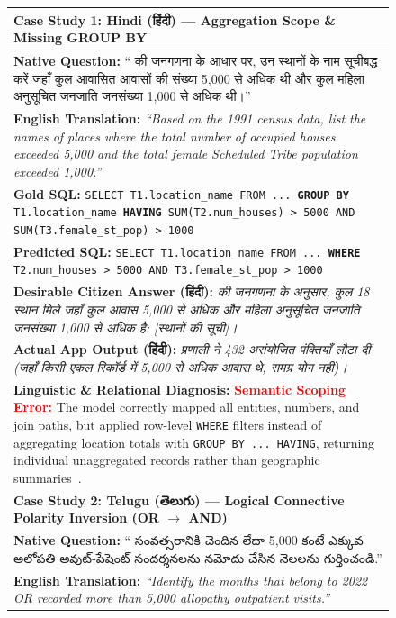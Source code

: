 \documentclass[conference]{IEEEtran}
\newcommand{\texthindi}[1]{{\hindifont #1}}
\newcommand{\texttelugu}[1]{{\telugufont #1}}
\newcommand{\texthindi}[1]{#1}
\newcommand{\texttelugu}[1]{#1}
\begin{document}
\begin{figure}[t]
\centering
\small
\renewcommand{\arraystretch}{1.2}
\begin{tabular}{|p{}|}
\hline
\textbf{\large Case Study 1: Hindi (\texthindi{हिंदी}) --- Aggregation Scope \& Missing GROUP BY} \\
\hline
\textbf{Native Question:} ``\texthindi{1991 की जनगणना के आधार पर, उन स्थानों के नाम सूचीबद्ध करें जहाँ कुल आवासित आवासों की संख्या 5,000 से अधिक थी और कुल महिला अनुसूचित जनजाति जनसंख्या 1,000 से अधिक थी।}'' \\
\textbf{English Translation:} \emph{``Based on the 1991 census data, list the names of places where the total number of occupied houses exceeded 5,000 and the total female Scheduled Tribe population exceeded 1,000.''} \\[3pt]
\textbf{Gold SQL:} \texttt{SELECT T1.location\_name FROM ... \textbf{GROUP BY} T1.location\_name \textbf{HAVING} SUM(T2.num\_houses) > 5000 AND SUM(T3.female\_st\_pop) > 1000} \\
\textbf{Predicted SQL:} \texttt{SELECT T1.location\_name FROM ... \textbf{WHERE} T2.num\_houses > 5000 AND T3.female\_st\_pop > 1000} \\[3pt]
\textbf{Desirable Citizen Answer (\texthindi{हिंदी}):} \emph{\texthindi{1991 की जनगणना के अनुसार, कुल 18 स्थान मिले जहाँ कुल आवास 5,000 से अधिक और महिला अनुसूचित जनजाति जनसंख्या 1,000 से अधिक है: [स्थानों की सूची]।}} \\
\textbf{Actual App Output (\texthindi{हिंदी}):} \emph{\texthindi{प्रणाली ने 432 असंयोजित पंक्तियाँ लौटा दीं (जहाँ किसी एकल रिकॉर्ड में 5,000 से अधिक आवास थे, समग्र योग नहीं)।}} \\[3pt]
\textbf{Linguistic \& Relational Diagnosis:} \textcolor{red}{\textbf{Semantic Scoping Error:}} The model correctly mapped all entities, numbers, and join paths, but applied row-level \texttt{WHERE} filters instead of aggregating location totals with \texttt{GROUP BY ... HAVING}, returning individual unaggregated records rather than geographic summaries~\cite{yu2018spider,pourreza2023dinsql}. \\
\hline
\hline
\textbf{\large Case Study 2: Telugu (\texttelugu{తెలుగు}) --- Logical Connective Polarity Inversion (OR $\rightarrow$ AND)} \\
\hline
\textbf{Native Question:} ``\texttelugu{2022 సంవత్సరానికి చెందిన లేదా 5,000 కంటే ఎక్కువ అలోపతి అవుట్-పేషెంట్ సందర్శనలను నమోదు చేసిన నెలలను గుర్తించండి.}'' \\
\textbf{English Translation:} \emph{``Identify the months that belong to 2022 OR recorded more than 5,000 allopathy outpatient visits.''} \\[3pt]

\end{tabular}
\end{figure}
\end{document}
